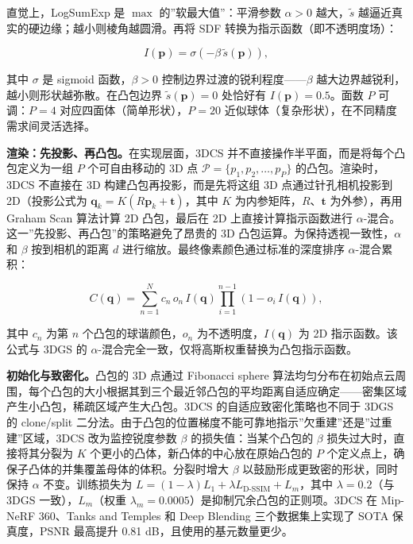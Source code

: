直觉上，LogSumExp 是 $\max$ 的”软最大值”：平滑参数 $\alpha > 0$ 越大，$\tilde{s}$ 越逼近真实的硬边缘；越小则棱角越圆滑。再将 SDF 转换为指示函数（即不透明度场）：

\begin{equation}
I(\mathbf{p}) = \sigma\!\left(-\beta \, \tilde{s}(\mathbf{p})\right),
\end{equation}

其中 $\sigma$ 是 sigmoid 函数，$\beta > 0$ 控制边界过渡的锐利程度——$\beta$ 越大边界越锐利，越小则形状越弥散。在凸包边界 $\tilde{s}(\mathbf{p}) = 0$ 处恰好有 $I(\mathbf{p}) = 0.5$。面数 $P$ 可调：$P=4$ 对应四面体（简单形状），$P=20$ 近似球体（复杂形状），在不同精度需求间灵活选择。

\textbf{渲染：先投影、再凸包。}在实现层面，3DCS 并不直接操作半平面，而是将每个凸包定义为一组 $P$ 个可自由移动的 3D 点 $\mathcal{P} = \{p_1, p_2, \ldots, p_P\}$ 的凸包。渲染时，3DCS 不直接在 3D 构建凸包再投影，而是先将这组 3D 点通过针孔相机投影到 2D（投影公式为 $\mathbf{q}_k = K(R\mathbf{p}_k + \mathbf{t})$，其中 $K$ 为内参矩阵，$R$、$\mathbf{t}$ 为外参），再用 Graham Scan 算法计算 2D 凸包，最后在 2D 上直接计算指示函数进行 $\alpha$-混合。这一”先投影、再凸包”的策略避免了昂贵的 3D 凸包运算。为保持透视一致性，$\alpha$ 和 $\beta$ 按到相机的距离 $d$ 进行缩放。最终像素颜色通过标准的深度排序 $\alpha$-混合累积：

\begin{equation}
C(\mathbf{q}) = \sum_{n=1}^{N} c_n \, o_n \, I(\mathbf{q}) \prod_{i=1}^{n-1}\!\left(1 - o_i \, I(\mathbf{q})\right),
\end{equation}

其中 $c_n$ 为第 $n$ 个凸包的球谐颜色，$o_n$ 为不透明度，$I(\mathbf{q})$ 为 2D 指示函数。该公式与 3DGS 的 $\alpha$-混合完全一致，仅将高斯权重替换为凸包指示函数。

\textbf{初始化与致密化。}凸包的 3D 点通过 Fibonacci sphere 算法均匀分布在初始点云周围，每个凸包的大小根据其到三个最近邻凸包的平均距离自适应确定——密集区域产生小凸包，稀疏区域产生大凸包。3DCS 的自适应致密化策略也不同于 3DGS 的 clone/split 二分法。由于凸包的位置梯度不能可靠地指示”欠重建”还是”过重建”区域，3DCS 改为监控锐度参数 $\beta$ 的损失值：当某个凸包的 $\beta$ 损失过大时，直接将其分裂为 $K$ 个更小的凸体，新凸体的中心放在原始凸包的 $P$ 个定义点上，确保子凸体的并集覆盖母体的体积。分裂时增大 $\beta$ 以鼓励形成更致密的形状，同时保持 $\alpha$ 不变。训练损失为 $L = (1-\lambda)L_1 + \lambda L_{\text{D-SSIM}} + L_m$，其中 $\lambda = 0.2$（与 3DGS 一致），$L_m$（权重 $\lambda_m = 0.0005$）是抑制冗余凸包的正则项。3DCS 在 Mip-NeRF 360、Tanks and Temples 和 Deep Blending 三个数据集上实现了 SOTA 保真度，PSNR 最高提升 0.81 dB，且使用的基元数量更少。

